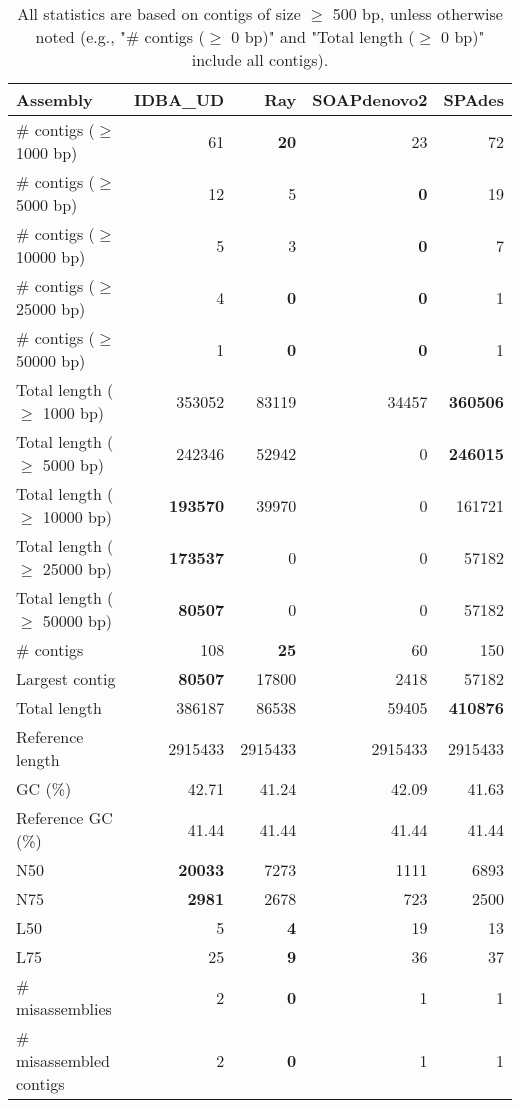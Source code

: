 \documentclass[12pt,a4paper]{article}
\begin{document}
\begin{table}[ht]
\begin{center}
\caption{All statistics are based on contigs of size $\geq$ 500 bp, unless otherwise noted (e.g., "\# contigs ($\geq$ 0 bp)" and "Total length ($\geq$ 0 bp)" include all contigs).}
\begin{tabular}{|l*{4}{|r}|}
\hline
Assembly & IDBA\_UD & Ray & SOAPdenovo2 & SPAdes \\ \hline
\# contigs ($\geq$ 1000 bp) & 61 & {\bf 20} & 23 & 72 \\ \hline
\# contigs ($\geq$ 5000 bp) & 12 & 5 & {\bf 0} & 19 \\ \hline
\# contigs ($\geq$ 10000 bp) & 5 & 3 & {\bf 0} & 7 \\ \hline
\# contigs ($\geq$ 25000 bp) & 4 & {\bf 0} & {\bf 0} & 1 \\ \hline
\# contigs ($\geq$ 50000 bp) & 1 & {\bf 0} & {\bf 0} & 1 \\ \hline
Total length ($\geq$ 1000 bp) & 353052 & 83119 & 34457 & {\bf 360506} \\ \hline
Total length ($\geq$ 5000 bp) & 242346 & 52942 & 0 & {\bf 246015} \\ \hline
Total length ($\geq$ 10000 bp) & {\bf 193570} & 39970 & 0 & 161721 \\ \hline
Total length ($\geq$ 25000 bp) & {\bf 173537} & 0 & 0 & 57182 \\ \hline
Total length ($\geq$ 50000 bp) & {\bf 80507} & 0 & 0 & 57182 \\ \hline
\# contigs & 108 & {\bf 25} & 60 & 150 \\ \hline
Largest contig & {\bf 80507} & 17800 & 2418 & 57182 \\ \hline
Total length & 386187 & 86538 & 59405 & {\bf 410876} \\ \hline
Reference length & 2915433 & 2915433 & 2915433 & 2915433 \\ \hline
GC (\%) & 42.71 & 41.24 & 42.09 & 41.63 \\ \hline
Reference GC (\%) & 41.44 & 41.44 & 41.44 & 41.44 \\ \hline
N50 & {\bf 20033} & 7273 & 1111 & 6893 \\ \hline
N75 & {\bf 2981} & 2678 & 723 & 2500 \\ \hline
L50 & 5 & {\bf 4} & 19 & 13 \\ \hline
L75 & 25 & {\bf 9} & 36 & 37 \\ \hline
\# misassemblies & 2 & {\bf 0} & 1 & 1 \\ \hline
\# misassembled contigs & 2 & {\bf 0} & 1 & 1 \\ \hline

\end{tabular}
\end{center}
\end{table}
\end{document}
